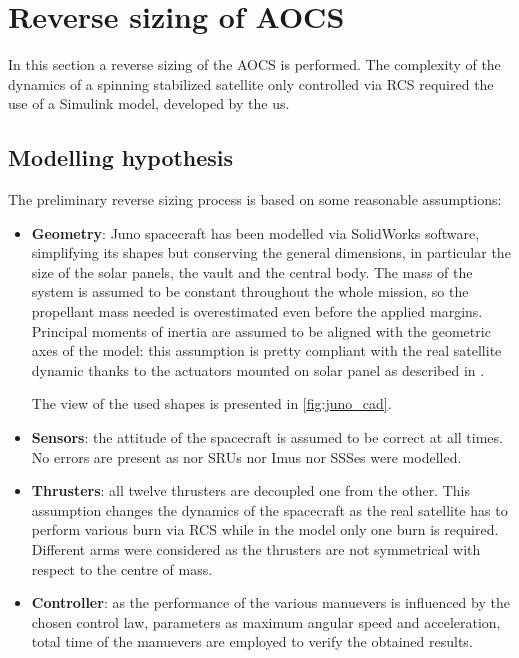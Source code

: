 \section{Reverse sizing of AOCS}
\label{sec:AOCS_sizing}

In this section a reverse sizing of the AOCS is performed. The complexity of the dynamics of a spinning stabilized satellite only controlled via RCS required the use of a Simulink model, developed by the us. 

\subsection{Modelling hypothesis}
\label{subsec: mod_hypo}
The preliminary reverse sizing process is based on some reasonable assumptions:

\begin{itemize}
    \item \textbf{Geometry}: Juno spacecraft has been modelled via SolidWorks software, simplifying its shapes but conserving the general dimensions, in particular the size of the solar panels, the vault and the central body. The mass of the system is assumed to be constant throughout the whole mission, so the propellant mass needed is overestimated even before the applied margins. 
    Principal moments of inertia are assumed to be aligned with the geometric axes of the model: this assumption is pretty compliant with the real satellite dynamic thanks to the actuators mounted on solar panel as described in \mref. 
       
    The view of the used shapes is presented in \autoref{fig:juno_cad}.

    \item \textbf{Sensors}: the attitude of the spacecraft is assumed to be correct at all times. No errors are present as nor SRUs nor Imus nor SSSes were modelled.
    
    \item \textbf{Thrusters}: all twelve thrusters are decoupled one from the other. This assumption changes the  dynamics of the spacecraft as the real satellite has to perform various burn via RCS while in the model only one burn is required. %
    Different arms were considered as the thrusters are not symmetrical with respect to the centre of mass. 

    \item \textbf{Controller}: as the performance of the various manuevers is influenced by the chosen control law, parameters as maximum angular speed and acceleration, total time of the manuevers are employed to verify the obtained results. 
    

\end{itemize}
